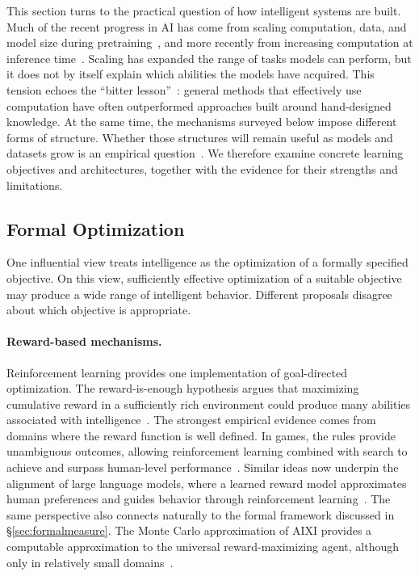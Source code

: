 \documentclass[acmsmall,screen,review,anonymous]{acmart}
\begin{document}
This section turns to the practical question of how intelligent systems are built.
%
Much of the recent progress in AI has come from scaling computation, data, and model size during pretraining~\citep{kaplan2020scalinglawsneurallanguage, hoffmann2022trainingcomputeoptimallargelanguage}, and more recently from increasing computation at inference time~\citep{openai2026openaio1card, muennighoff2025s1simpletesttimescaling}.
%
Scaling has expanded the range of tasks models can perform, but it does not by itself explain which abilities the models have acquired.
%
This tension echoes the ``bitter lesson''~\citep{sutton2019bitter}: general methods that effectively use computation have often outperformed approaches built around hand-designed knowledge.
%
At the same time, the mechanisms surveyed below impose different forms of structure.
%
Whether those structures will remain useful as models and datasets grow is an empirical question~\citep{wei2022emergent}.
%
We therefore examine concrete learning objectives and architectures, together with the evidence for their strengths and limitations.

\subsection{Formal Optimization}

One influential view treats intelligence as the optimization of a formally specified objective.
%
On this view, sufficiently effective optimization of a suitable objective may produce a wide range of intelligent behavior.
%
Different proposals disagree about which objective is appropriate.




\paragraph{Reward-based mechanisms.}

Reinforcement learning provides one implementation of goal-directed optimization.
%
The reward-is-enough hypothesis argues that maximizing cumulative reward in a sufficiently rich environment could produce many abilities associated with intelligence~\citep{silver2021}.
%
The strongest empirical evidence comes from domains where the reward function is well defined.
%
In games, the rules provide unambiguous outcomes, allowing reinforcement learning combined with search to achieve and surpass human-level performance~\citep{Silver2016}.
%
Similar ideas now underpin the alignment of large language models, where a learned reward model approximates human preferences and guides behavior through reinforcement learning~\citep{ouyang2022traininglanguagemodelsfollow}.
%
The same perspective also connects naturally to the formal framework discussed in \S\ref{sec:formalmeasure}. 
%
The Monte Carlo approximation of AIXI provides a computable approximation to the universal reward-maximizing agent, although only in relatively small domains~\citep{2016945.2016949}.
\end{document}

